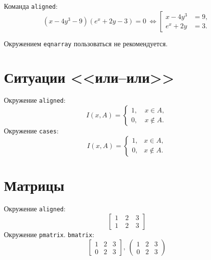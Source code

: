 \documentclass[a4paper,12pt]{article}
\begin{document}
Команда \texttt{aligned}:
$$
(x- 4y^3 -9)(e^x + 2y -3) = 0\ \Longleftrightarrow \left[\begin{aligned}
                                    x- 4y^3 &= 9,\\
				     e^x + 2y &= 3.
                                    \end{aligned}\right.
$$

Окружением \texttt{eqnarray} пользоваться не рекомендуется.

\section{Ситуации <<или--или>>}
Окружение \texttt{aligned}:
$$
I(x,A) = \left\lbrace\begin{aligned}
          1, &\ x\in A,\\
	  0, &\ x\notin A.
         \end{aligned}\right.
$$
Окружение \texttt{cases}:
$$
I(x,A) = \begin{cases}
          1, & x\in A,\\
	  0, & x\notin A.
         \end{cases}
$$
\section{Матрицы}
Окружение \texttt{aligned}:
$$
\left[\begin{aligned}
          1\ & 2\ & 3\\
	  1\ & 2\ & 3
         \end{aligned}\right]
$$
Окружение \texttt{pmatrix}. \texttt{bmatrix}:
$$
 \begin{bmatrix}
          1 & 2 & 3\\
	  0 & 2 & 3
 \end{bmatrix},\ 
 \begin{pmatrix}
          1 & 2 & 3\\
	  0 & 2 & 3
 \end{pmatrix}
$$
\end{document}
